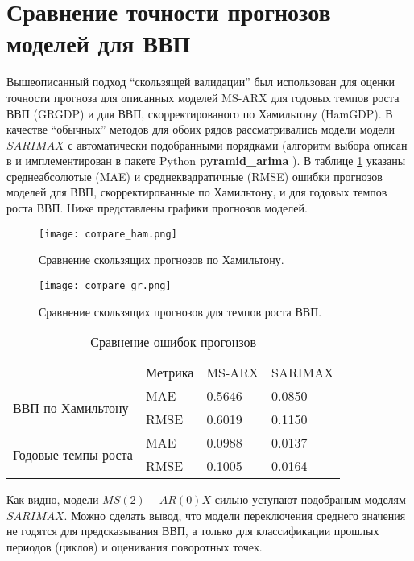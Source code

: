 \documentclass[a4paper,14pt]{extreport}
\begin{document}
	
	\section{Сравнение точности прогнозов моделей для ВВП}
	
	Вышеописанный подход ``скользящей валидации'' был использован для оценки точности прогноза для описанных моделей MS-ARX для годовых темпов роста ВВП (GRGDP) и для ВВП, скорректированого по Хамильтону (HamGDP). В качестве ``обычных'' методов для обоих рядов рассматривались модели модели $SARIMAX$ с автоматически подобранными порядками (алгоритм выбора описан в \cite{hynd_autoarima} и имплементирован в пакете Python \textbf{pyramid\_arima} \cite{pyramid_arima}). В таблице \ref{tbl:errors} указаны среднеабсолютые (MAE) и среднеквадратичные (RMSE) ошибки прогнозов моделей для ВВП, скорректированные по Хамильтону, и для годовых темпов роста ВВП. Ниже представлены графики прогнозов моделей.
	
	\begin{figure}
		\texttt{[image: compare\_ham.png]}
		\caption{Сравнение скользящих прогнозов по Хамильтону.}
		\label{fig:rollcompare-ham}
	\end{figure}
	
	\begin{figure}
		\texttt{[image: compare\_gr.png]}
		\caption{Сравнение скользящих прогнозов для темпов роста ВВП.}
		\label{fig:rollcompare-tr}
	\end{figure}
	
	\begin{table}[]
		\centering
		\caption{Сравнение ошибок прогонзов}
		\label{tbl:errors}
		\begin{tabular}{llll}
			& Метрика & MS-ARX & SARIMAX \\
			\multirow{2}{*}{ВВП по Хамильтону} & MAE    & 0.5646 & 0.0850  \\
			& RMSE   & 0.6019 & 0.1150  \\
			\multirow{2}{*}{Годовые темпы роста}       & MAE    & 0.0988 & 0.0137  \\
			& RMSE   & 0.1005 & 0.0164 
		\end{tabular}
	\end{table}
	
	
	Как видно, модели $MS(2)-AR(0)X$ сильно уступают подобраным моделям $SARIMAX$. Можно сделать вывод, что модели переключения среднего значения не годятся для предсказывания ВВП, а только для классификации прошлых периодов (циклов) и оценивания поворотных точек.
	
\end{document}
